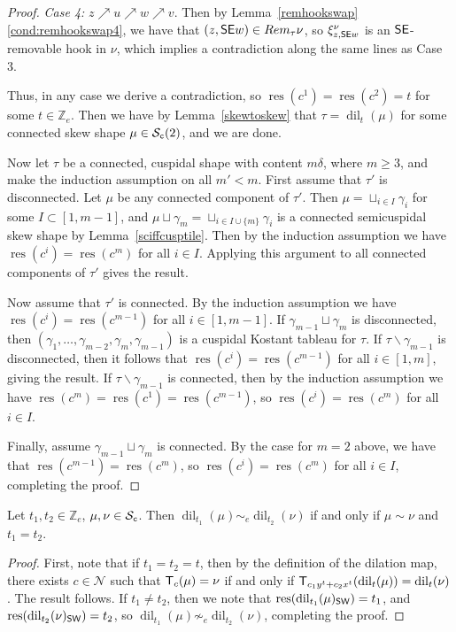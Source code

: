 \documentclass[Unicode,ALCO]{cedram}
\newcommand{\res}{\operatorname{res}}
\newcommand{\infl}{\operatorname{dil}}
\newcommand{\Z}{\mathbb{Z}}
\newcommand{\N}{\mathcal{N}}
\newcommand{\SSSS}{\mathcal{S}}
\newcommand{\0}{{\bar 0}}
\newcommand{\ZZ}{{\mathbb Z}}
\newcommand{\T}{{\sf T}}
\newcommand{\ssee}{{\sf SE}}
\newcommand{\ssww}{{\sf SW}}
\begin{document}
\begin{proof}
{\em Case 4:} \(z \nearrow u \nearrow w \nearrow v\).  Then by Lemma~\ref{remhookswap}\eqref{cond:remhookswap4}, we have that \((z, \ssee w) \in \textup{Rem}_\tau\nu\), so \(\xi^\nu_{z, \ssee w}\) is an \(\ssee\)-removable hook in \(\nu\), which implies a contradiction along the same lines as Case 3. 

Thus, in any case we derive a contradiction, so \(\res(c^1) = \res(c^2) = t\) for some \(t \in \Z_e\). Then we have by Lemma~\ref{skewtoskew} that \(\tau = \infl_t(\mu)\) for some connected skew shape \(\mu \in \SSSS_{\tt c}(2)\), and we are done.

Now let \(\tau\) be a connected, cuspidal shape with content \(m\delta\), where \(m \geq 3\), and make the induction assumption on all \(m' < m\). First assume that \(\tau'\) is disconnected. 
Let \(\mu\) be any connected component of \(\tau'\). Then \(\mu = \sqcup_{i \in I} \gamma_i\) for some \(I \subset [1,m-1]\), and \(\mu \sqcup \gamma_m = \sqcup_{i \in I\cup\{m\}} \gamma_i\) is a connected semicuspidal skew shape by Lemma~\ref{sciffcusptile}. 
Then by the induction assumption we have \(\res(c^i) = \res(c^m)\) for all \(i \in I\). Applying this argument to all connected components of \(\tau'\) gives the result. 

Now assume that \(\tau'\) is connected. By the induction assumption we have \(\res(c^i) = \res(c^{m-1})\) for all \(i \in [1,m-1]\). If \(\gamma_{m-1} \sqcup \gamma_m\) is disconnected, then \((\gamma_1, \ldots, \gamma_{m-2}, \gamma_m, \gamma_{m-1})\) is a cuspidal Kostant tableau for \(\tau\). If \(\tau \backslash \gamma_{m-1}\) is disconnected, then it follows that \(\res(c^i) = \res(c^{m-1})\) for all \(i \in [1,m]\), giving the result. If \(\tau \backslash \gamma_{m-1}\) is connected, then by the induction assumption we have \(\res(c^m) = \res(c^1) = \res(c^{m-1})\), so \(\res(c^i) = \res(c^m)\) for all \(i \in I\).

Finally, assume \(\gamma_{m-1} \sqcup \gamma_m\) is connected. By the case for \(m=2\) above, we have that \(\res(c^{m-1}) = \res(c^m)\), so \(\res(c^i) = \res(c^m)\) for all \(i \in I\), completing the proof.
\end{proof}

\begin{lemma}\label{delconsim}
Let \(t_1, t_2 \in \ZZ_e\),  \(\mu, \nu \in \SSSS_{\tt c}\). Then \(\infl_{t_1}(\mu) \sim_e \infl_{t_2}(\nu)\) if and only if \(\mu \sim \nu\) and \(t_1 =t_2\).
\end{lemma}
\begin{proof}
First, note that if \(t_1 = t_2 = t\), then by the definition of the dilation map, there exists \(c \in \N\) such that \(\T_c(\mu) = \nu\) if and only if \(\T_{c_1y^t + c_2x^t}(\infl_t(\mu)) = \infl_t(\nu)\). The result follows. If \(t_1 \neq t_2\), then we note that \(\res(\infl_{t_1}(\mu)_{\ssww}) = t_1\), and \(\res(\infl_{t_2}(\nu)_{\ssww}) = t_2\), so \(\infl_{t_1}(\mu) \not \sim_e \infl_{t_2}(\nu)\), completing the proof.
\end{proof}
\end{document}
